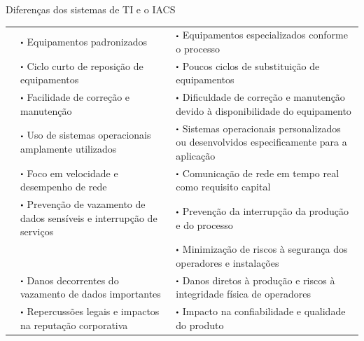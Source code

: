     \begin{quadro}[htbp]
        \caption{\label{qdr:it-iacs}Diferenças dos sistemas de TI e o IACS}
        \begin{tabular}{|M{3.25cm}|p{5.50cm}|p{5.50cm}|}
            \hline
             &  &  \\
            \hline
             & $\sbullet$ Equipamentos padronizados & $\sbullet$ Equipamentos especializados conforme o processo \\
            & $\sbullet$ Ciclo curto de reposição de equipamentos & $\sbullet$ Poucos ciclos de substituição de equipamentos \\
            & $\sbullet$ Facilidade de correção e manutenção & $\sbullet$ Dificuldade de correção e manutenção devido à disponibilidade do equipamento \\
            & $\sbullet$ Uso de sistemas operacionais amplamente utilizados & $\sbullet$ Sistemas operacionais personalizados ou desenvolvidos especificamente para a aplicação \\
            & $\sbullet$ Foco em velocidade e desempenho de rede & $\sbullet$ Comunicação de rede em tempo real como requisito capital \\
            \hline
             & $\sbullet$ Prevenção de vazamento de dados sensíveis e interrupção de serviços & $\sbullet$ Prevenção da interrupção da produção e do processo \\
            & & $\sbullet$ Minimização de riscos à segurança dos operadores e instalações \\
            \hline
             & $\sbullet$ Danos decorrentes do vazamento de dados importantes & $\sbullet$ Danos diretos à produção e riscos à integridade física de operadores \\
            & $\sbullet$ Repercussões legais e impactos na reputação corporativa & $\sbullet$ Impacto na confiabilidade e qualidade do produto \\
            \hline
	\end{tabular}
	\begin{flushleft}
	\end{flushleft}
    \end{quadro}

